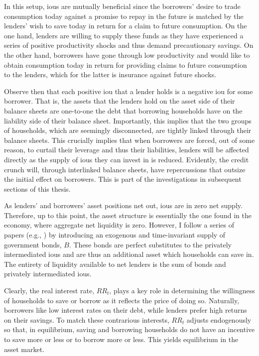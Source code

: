 \documentclass[12pt]{article} %
\numberwithin{equation}{section} %
\numberwithin{figure}{section}
\numberwithin{table}{section}
\begin{document}
In this setup, \Gls{iou}s are mutually beneficial since the borrowers' desire to trade consumption today against a promise to repay in the future is matched by the lenders' wish to save today in return for a claim to future consumption. On the one hand, lenders are willing to supply these funds as they have experienced a series of positive productivity shocks and thus demand precautionary savings. On the other hand, borrowers have gone through low productivity and would like to obtain consumption today in return for providing claims to future consumption to the lenders, which for the latter is insurance against future shocks.

Observe then that each positive \Gls{iou} that a lender holds is a negative \Gls{iou} for some borrower. That is, the assets that the lenders hold on the asset side of their balance sheets are one-to-one the debt that borrowing households have on the liability side of their balance sheet. Importantly, this implies that the two groups of households, which are seemingly disconnected, are tightly linked through their balance sheets. This crucially implies that when borrowers are forced, out of some reason, to curtail their leverage and thus their liabilities, lenders will be affected directly as the supply of \Gls{iou}s they can invest in is reduced. Evidently, the credit crunch will, through interlinked balance sheets, have repercussions that outsize the initial effect on borrowers. This is part of the investigations in subsequent sections of this thesis.

As lenders' and borrowers' asset positions net out, \Gls{iou}s are in zero net supply. Therefore, up to this point, the asset structure is essentially the one found in the \textcite{huggett1993} economy, where aggregate net liquidity is zero. However, I follow a series of papers (e.g.\cite{gl2017}, \cite{bayer2023}) by introducing an exogenous and time-invariant supply of government bonds, $B$. These bonds are perfect substitutes to the privately intermediated \Gls{iou}s and are thus an additional asset which households can save in. The entirety of liquidity available to net lenders is the sum of bonds and privately intermediated \Gls{iou}s.

Clearly, the real interest rate, $RR_t$, plays a key role in determining the willingness of households to save or borrow as it reflects the price of doing so. Naturally, borrowers like low interest rates on their debt, while lenders prefer high returns on their savings. To match these contrarious interests, $RR_t$ adjusts endogenously so that, in equilibrium, saving and borrowing households do not have an incentive to save more or less or to borrow more or less. This yields equilibrium in the asset market.
\end{document}
